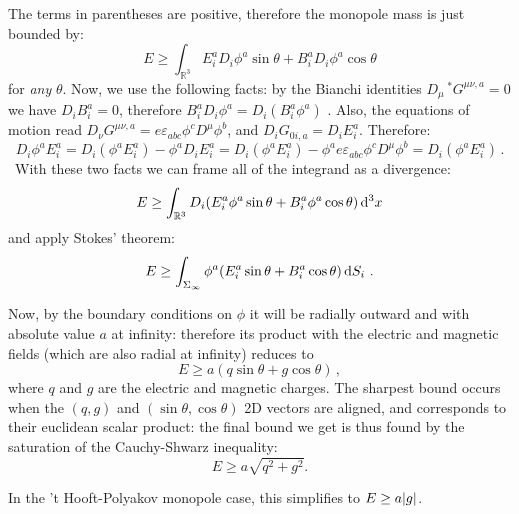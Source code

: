\documentclass[main.tex]{subfiles}
\begin{document}
The terms in parentheses are positive, therefore the monopole mass is just bounded by:
%
\begin{equation}
  E \geq \int_{\mathbb R^3}
  E_i^a D_i \phi^a \sin \theta+ B_i^a D_i \phi^a \cos \theta
\end{equation}
%
for \emph{any} \(\theta\).
Now, we use the following facts: by the Bianchi identities \(D_\mu \,^* G^{\mu\nu, a} = 0\) we have \(D_i B^a_i = 0\), therefore \(B_i^a D_i \phi^a = D_i(B_i^a \phi^a)\) .
Also, the equations of motion read \(D_\nu G^{\mu\nu, a} = e \varepsilon_{abc} \phi^c D^\mu \phi^b\), and \(D_i G_{0i, a} = D_i E_i^a\).  Therefore:
%
\begin{equation}
  D_i \phi^a E_i^a
  = D_i (\phi ^a E_i^a) - \phi^a D_i E^a_i
  = D_i (\phi ^a E_i^a) - \phi^a e \varepsilon_{abc} \phi^c D^\mu \phi^b
  = D_i (\phi ^a E_i^a)\,.
\end{equation}
\
With these two facts we can frame all of the integrand as a divergence:
%
\begin{equation}
  E \geq \int_{\mathbb R^3}
  D_i \qty(E_i^a \phi^a \sin \theta+ B_i^a  \phi^a \cos \theta) \dd[3]{x}
\end{equation}
%
and apply Stokes' theorem:
%
\begin{equation}
  E \geq \int_{\Sigma_\infty}
  \phi^a \qty(E_i^a  \sin \theta+ B_i^a   \cos \theta ) \dd{S_i}\,.
\end{equation}

Now, by the boundary conditions on \(\phi\) it will be radially outward  and with absolute value \(a\) at infinity: therefore its product with the electric and magnetic fields (which are also radial at infinity) reduces to
%
\begin{equation}
  E \geq a (q\sin \theta + g \cos \theta)\,,
\end{equation}
%
where \(q\) and \(g\) are the electric and magnetic charges.
The sharpest bound occurs when the \((q, g)\) and \((\sin \theta, \cos \theta)\)  2D vectors are aligned, and corresponds to their euclidean scalar product: the final bound we get is thus found by the saturation of the Cauchy-Shwarz inequality: 
\begin{equation}
E \geq a \sqrt{q^2 + g^2} .
\end{equation}

In the 't Hooft-Polyakov monopole case, this simplifies to \(E \geq a \abs{g} \).
\end{document}

